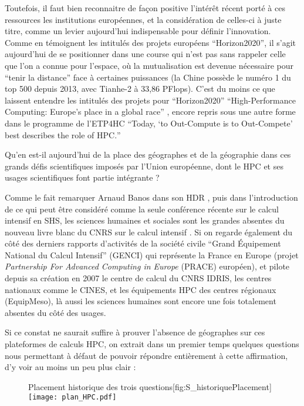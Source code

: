 Toutefois, il faut bien reconnaitre de façon positive l'intérêt récent porté à ces ressources les institutions européennes, et la considération de celles-ci à juste titre, comme un levier aujourd'hui indispensable pour définir l'innovation. Comme en témoignent les intitulés des projets européens \enquote{Horizon2020}, il s'agit aujourd'hui de se positionner dans une course qui n'est pas sans rappeler celle que l'on a connue pour l'espace, où la mutualisation est devenue nécessaire pour \enquote{tenir la distance} face à certaines puissances (la Chine possède le numéro 1 du top 500 depuis 2013, avec Tianhe-2 à 33,86 PFlops). C'est du moins ce que laissent entendre les intitulés des projets pour \enquote{Horizon2020} \foreignquote{english}{High-Performance Computing: Europe's place in a global race} \autocite{HPCHorizon2020}, encore repris sous une autre forme dans le programme de l'ETP4HC \autocites{ETP4HPC2012, ETP4HPC2013} \foreignquote{english}{Today, \enquote{to Out-Compute is to Out-Compete} best describes the role of HPC.}

Qu'en est-il aujourd'hui de la place des géographes et de la géographie dans ces grands défis scientifiques imposés par l'Union européenne, dont le HPC et ses usages scientifiques font partie intégrante ?

Comme le fait remarquer Arnaud Banos dans son HDR \autocite[63]{Banos2013}, puis dans l'introduction de ce qui peut être considéré comme la seule conférence récente sur le calcul intensif en SHS, les sciences humaines et sociales sont les grandes absentes du nouveau livre blanc du CNRS sur le calcul intensif \autocite{COCIN2012}. Si on regarde également du côté des derniers rapports d'activités de la société civile \enquote{Grand Équipement National du Calcul Intensif} (GENCI) \autocite{GENCI2014} qui représente la France en Europe (projet \textit{Partnership For Advanced Computing in Europe} (PRACE) européen), et pilote depuis sa création en 2007 le centre de calcul du CNRS IDRIS, les centres nationaux comme le CINES, et les équipements HPC des centres régionaux (EquipMeso), là aussi les sciences humaines sont encore une fois totalement absentes du côté des usages.

Si ce constat ne saurait suffire à prouver l'absence de géographes sur ces plateformes de calculs HPC, on extrait dans un premier temps quelques questions nous permettant à défaut de pouvoir répondre entièrement à cette affirmation, d'y voir au moins un peu plus clair :

\begin{figure}[!h]
\begin{sidecaption}{Placement historique des trois questions}[fig:S_historiquePlacement]
  \centering
 \texttt{[image: plan\_HPC.pdf]}
  \end{sidecaption}
\end{figure}

